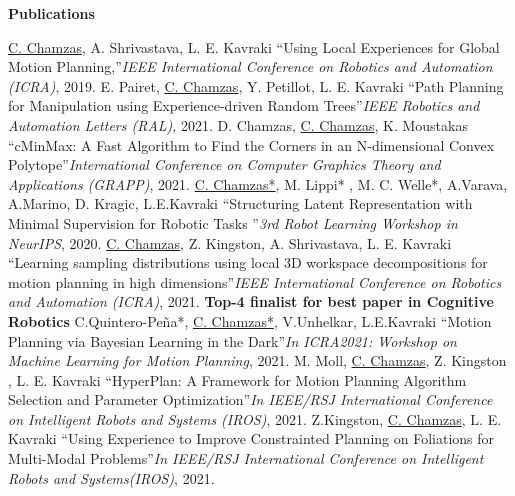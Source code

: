 \documentclass[letterpaper,11pt]{article}
\newcommand{\resheading}[1]{{\large \colorbox{mygrey}{\begin{minipage}{\textwidth}{\textbf{#1 \vphantom{p\^{E}}}}\end{minipage}}}}
\begin{document}
\resheading{Publications }
\begingroup
	\renewcommand{\section}[2]{}%
\begin{thebibliography}{9}
	\underline{C. Chamzas}, A. Shrivastava, L. E. Kavraki
	``Using Local Experiences for Global Motion Planning,''\textit{IEEE International Conference on Robotics and Automation (ICRA)}, 2019.
	E. Pairet, \underline{C. Chamzas}, Y. Petillot, L. E. Kavraki
	``Path Planning for Manipulation using Experience-driven Random Trees''\textit{IEEE Robotics and Automation Letters (RAL)}, 2021.
	D. Chamzas, \underline{C. Chamzas}, K. Moustakas
	``cMinMax: A Fast Algorithm to Find the Corners in an N-dimensional Convex Polytope''\textit{International Conference on Computer Graphics Theory and Applications (GRAPP)}, 2021. 
	\underline{C. Chamzas*}, M. Lippi* , M. C. Welle*, A.Varava, A.Marino, D. Kragic, L.E.Kavraki ``Structuring Latent Representation with Minimal Supervision for Robotic Tasks ''\textit{3rd Robot Learning Workshop in NeurIPS}, 2020. 
    \underline{C. Chamzas}, Z. Kingston, A. Shrivastava, L. E. Kavraki
	``Learning sampling distributions using local 3D workspace decompositions for motion planning in high dimensions''\textit{IEEE International Conference on Robotics and Automation (ICRA)}, 2021. \textbf{Top-4 finalist for best paper in Cognitive Robotics} 
     C.Quintero-Peña*, \underline{C. Chamzas*}, V.Unhelkar, L.E.Kavraki
	``Motion Planning via Bayesian Learning in the Dark''\textit{In ICRA2021: Workshop on Machine Learning for Motion Planning}, 2021.  
     M. Moll, \underline{C. Chamzas}, Z. Kingston , L. E. Kavraki
     ``HyperPlan: A Framework for Motion Planning Algorithm Selection and Parameter Optimization''\textit{In IEEE/RSJ International Conference on Intelligent Robots and Systems (IROS)}, 2021.  
     Z.Kingston, \underline{C. Chamzas}, L. E. Kavraki
     ``Using Experience to Improve Constrainted Planning on Foliations for Multi-Modal Problems''\textit{In IEEE/RSJ International Conference on Intelligent Robots and Systems(IROS)}, 2021.  

	\end{thebibliography}
	\endgroup
\end{document}
